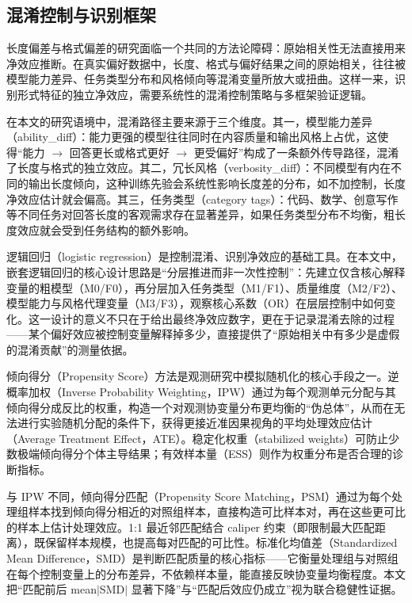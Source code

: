 \documentclass[9pt,a4paper,fontset=windows]{ctexart}
\theoremstyle{definition}
\numberwithin{equation}{section}
\begin{document}
\subsection{混淆控制与识别框架}
长度偏差与格式偏差的研究面临一个共同的方法论障碍：原始相关性无法直接用来净效应推断。在真实偏好数据中，长度、格式与偏好结果之间的原始相关，往往被模型能力差异、任务类型分布和风格倾向等混淆变量所放大或扭曲。这样一来，识别形式特征的独立净效应，需要系统性的混淆控制策略与多框架验证逻辑。

在本文的研究语境中，混淆路径主要来源于三个维度。其一，模型能力差异（ability\_diff）：能力更强的模型往往同时在内容质量和输出风格上占优，这使得“能力 \(\rightarrow\) 回答更长或格式更好 \(\rightarrow\) 更受偏好”构成了一条额外传导路径，混淆了长度与格式的独立效应。其二，冗长风格（verbosity\_diff）：不同模型有内在不同的输出长度倾向，这种训练先验会系统性影响长度差的分布，如不加控制，长度净效应估计就会偏高。其三，任务类型（category tags）：代码、数学、创意写作等不同任务对回答长度的客观需求存在显著差异，如果任务类型分布不均衡，粗长度效应就会受到任务结构的额外影响。

逻辑回归（logistic regression）是控制混淆、识别净效应的基础工具。在本文中，嵌套逻辑回归的核心设计思路是“分层推进而非一次性控制”：先建立仅含核心解释变量的粗模型（M0/F0），再分层加入任务类型（M1/F1）、质量维度（M2/F2）、模型能力与风格代理变量（M3/F3），观察核心系数（OR）在层层控制中如何变化。这一设计的意义不只在于给出最终净效应数字，更在于记录混淆去除的过程——某个偏好效应被控制变量解释掉多少，直接提供了“原始相关中有多少是虚假的混淆贡献”的测量依据。

倾向得分（Propensity Score）方法是观测研究中模拟随机化的核心手段之一。逆概率加权（Inverse Probability Weighting，IPW）通过为每个观测单元分配与其倾向得分成反比的权重，构造一个对观测协变量分布更均衡的“伪总体”，从而在无法进行实验随机分配的条件下，获得更接近准因果视角的平均处理效应估计（Average Treatment Effect，ATE）。稳定化权重（stabilized weights）可防止少数极端倾向得分个体主导结果；有效样本量（ESS）则作为权重分布是否合理的诊断指标。

与 IPW 不同，倾向得分匹配（Propensity Score Matching，PSM）通过为每个处理组样本找到倾向得分相近的对照组样本，直接构造可比样本对，再在这些更可比的样本上估计处理效应。1:1 最近邻匹配结合 caliper 约束（即限制最大匹配距离），既保留样本规模，也提高每对匹配的可比性。标准化均值差（Standardized Mean Difference，SMD）是判断匹配质量的核心指标——它衡量处理组与对照组在每个控制变量上的分布差异，不依赖样本量，能直接反映协变量均衡程度。本文把“匹配前后 mean\(|\)SMD\(|\) 显著下降”与“匹配后效应仍成立”视为联合稳健性证据。
\end{document}

